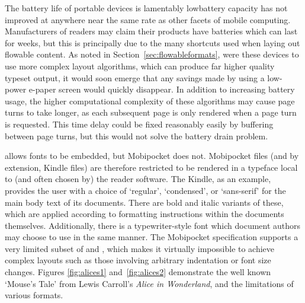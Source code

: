 The battery life of portable devices is lamentably low\ed battery capacity has not improved at anywhere near the same rate as other facets of mobile computing. Manufacturers of \ebook{} readers may claim their products have batteries which can last for weeks, but this is principally due to the many shortcuts used when laying out flowable content. As noted in Section~\ref{sec:flowableformats}, were these devices to use more complex layout algorithms, which can produce far higher quality typeset output, it would soon emerge that any savings made by using a low-power e-paper screen would quickly disappear. In addition to increasing battery usage, the higher computational complexity of these algorithms may cause page turns to take longer, as each subsequent page is only rendered when a page turn is requested. This time delay could be fixed reasonably easily by buffering between page turns, but this would not solve the battery drain problem.


\epub{} allows fonts to be embedded, but Mobipocket does not. Mobipocket files (and by extension, Kindle files) are therefore restricted to be rendered in a typeface local to (and often chosen by) the reader software. The Kindle, as an example, provides the user with a choice of `regular', `condensed', or `sans-serif' for the main body text of its documents. There are bold and italic variants of these, which are applied according to formatting instructions within the documents themselves. Additionally, there is a typewriter-style font which document authors may choose to use in the same manner. The Mobipocket specification supports a very limited subset of \html{} and \css{}, which makes it virtually impossible to achieve complex layouts such as those involving arbitrary indentation or font size changes. Figures \ref{fig:alices1} and~\ref{fig:alices2} demonstrate the well known `Mouse's Tale' from Lewis Carroll's \emph{Alice in Wonderland}, and the limitations of various formats.


